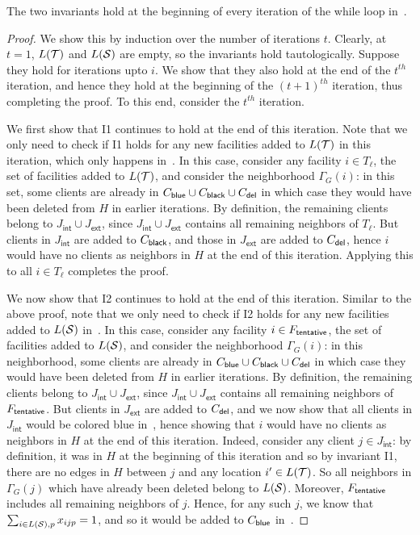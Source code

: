 \begin{claim}
\label{cl:inv}
The two invariants hold at the beginning of every iteration of the while loop in~.
\end{claim}
\begin{proof}
We show this by induction over the number of iterations $t$. Clearly, at $t=1$, $L({\cal T})$ and $L({\cal S})$ are empty, so the invariants hold tautologically. Suppose they hold for iterations upto $i$. We show that they also hold at the end of the $t^{th}$ iteration, and hence they hold at the beginning of the $(t+1)^{th}$ iteration, thus completing the proof. To this end, consider the $t^{th}$ iteration.

\medskip \noindent We first show that I1 continues to hold at the end of this iteration. Note that we only need to check if I1 holds for any new facilities added to $L({\cal T})$ in this iteration, which only happens in~. In this case, consider any facility $i \in T_\ell$, the set of facilities added to $L({\cal T})$, and consider the neighborhood $\Gamma_G(i)$: in this set, some clients are already in $C_{\mathsf{blue}} \cup C_{\mathsf{black}} \cup C_{\mathsf{del}}$ in which case they would have been deleted from $H$ in earlier iterations. By definition, the remaining clients belong to $J_\mathsf{int} \cup J_\mathsf{ext}$, since $J_\mathsf{int} \cup J_\mathsf{ext}$ contains all remaining neighbors of $T_\ell$. But clients in $J_\mathsf{int} $ are added to $C_{\mathsf{black}}$, and those in $ J_\mathsf{ext}$ are added to $C_{\mathsf{del}}$, hence $i$ would have no  clients as neighbors in $H$ at the end of this iteration. Applying this to all $i \in T_\ell$ completes the proof.

\medskip \noindent We now show that I2 continues to hold at the end of this iteration. Similar to the above proof, note that we only need to check if I2 holds for any new facilities added to $L({\cal S})$ in~. In this case, consider any facility $i \in F_\mathsf{tentative}$, the set of facilities added to $L({\cal S})$, and consider the neighborhood $\Gamma_G(i)$: in this neighborhood, some clients are already in $C_{\mathsf{blue}} \cup C_{\mathsf{black}} \cup C_{\mathsf{del}}$ in which case they would have been deleted from $H$ in earlier iterations. By definition, the remaining clients belong to $J_\mathsf{int} \cup J_\mathsf{ext}$, since $J_\mathsf{int} \cup J_\mathsf{ext}$ contains all remaining neighbors of $F_\mathsf{tentative}$. But clients in $J_\mathsf{ext}$ are added to $C_{\mathsf{del}}$, and we now show that all clients in $J_\mathsf{int}$ would be colored blue in~, hence showing that $i$ would have no clients as neighbors in $H$ at the end of this iteration.
Indeed, consider any client $j \in J_\mathsf{int}$: by definition, it was in $H$ at the beginning of this iteration and so by invariant I1, there are no edges in $H$ between $j$ and any location $i' \in L({\cal T})$. So all neighbors in $\Gamma_G(j)$ which have already been deleted belong to $L({\cal S})$. Moreover, $F_\mathsf{tentative}$ includes all remaining neighbors of $j$. Hence, for any such $j$, we know that $\sum_{i \in L({\cal S}), p} x_{ijp} = 1$, and so it would be
added to $C_{\mathsf{blue}}$ in~.
\end{proof}


